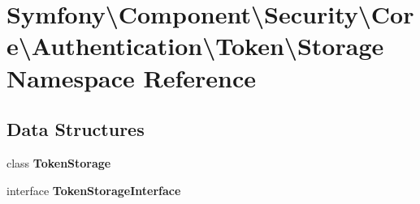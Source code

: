 \section{Symfony\textbackslash{}Component\textbackslash{}Security\textbackslash{}Core\textbackslash{}Authentication\textbackslash{}Token\textbackslash{}Storage Namespace Reference}
\label{namespace_symfony_1_1_component_1_1_security_1_1_core_1_1_authentication_1_1_token_1_1_storage}
\subsection*{Data Structures}
\begin{DoxyCompactItemize}
\item 
class {\bf Token\+Storage}
\item 
interface {\bf Token\+Storage\+Interface}
\end{DoxyCompactItemize}
